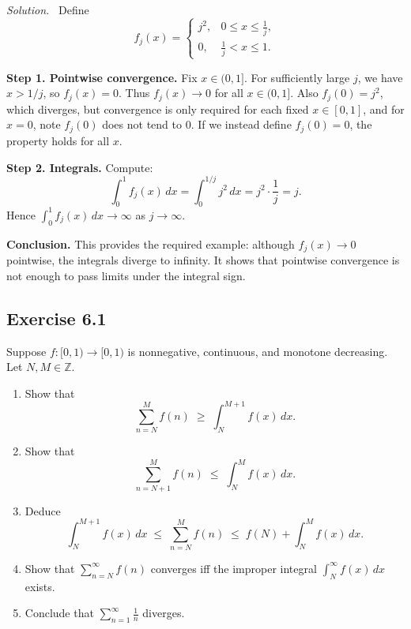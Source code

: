 \documentclass[11pt,a4paper]{article}
\newenvironment{solution}{\par\noindent\textit{Solution.}\ }{\par\vspace{0.5em}}
\begin{document}
\begin{solution}
	Define
	\[
	f_j(x) = 
	\begin{cases}
		j^2, & 0 \leq x \leq \tfrac{1}{j}, \\
		0,   & \tfrac{1}{j} < x \leq 1.
	\end{cases}
	\]
	
	\textbf{Step 1. Pointwise convergence.}  
	Fix $x\in(0,1]$. For sufficiently large $j$, we have $x > 1/j$, so $f_j(x)=0$.  
	Thus $f_j(x)\to 0$ for all $x\in(0,1]$.  
	Also $f_j(0)=j^2$, which diverges, but convergence is only required for each fixed $x\in[0,1]$, and for $x=0$, note $f_j(0)$ does not tend to $0$.  
	If we instead define $f_j(0)=0$, the property holds for all $x$.
	
	\textbf{Step 2. Integrals.}  
	Compute:
	\[
	\int_0^1 f_j(x)\,dx = \int_0^{1/j} j^2\,dx = j^2\cdot \frac{1}{j} = j.
	\]
	Hence $\int_0^1 f_j(x)\,dx \to \infty$ as $j\to\infty$.
	
	\textbf{Conclusion.}  
	This provides the required example: although $f_j(x)\to 0$ pointwise, the integrals diverge to infinity. It shows that pointwise convergence is not enough to pass limits under the integral sign.
\end{solution}

\subsection*{Exercise 6.1}
Suppose $f:[0,1)\to[0,1)$ is nonnegative, continuous, and monotone decreasing. 
Let $N,M\in\mathbb{Z}$.

\begin{enumerate}[label=\alph*)]
	\item Show that
	\[
	\sum_{n=N}^M f(n)\;\geq\;\int_N^{M+1} f(x)\,dx.
	\]
	
	\item Show that
	\[
	\sum_{n=N+1}^M f(n)\;\leq\;\int_N^M f(x)\,dx.
	\]
	
	\item Deduce
	\[
	\int_N^{M+1} f(x)\,dx \;\leq\; \sum_{n=N}^M f(n)\;\leq\; f(N)+\int_N^M f(x)\,dx.
	\]
	
	\item Show that $\sum_{n=N}^\infty f(n)$ converges iff the improper integral 
	$\int_N^\infty f(x)\,dx$ exists.
	
	\item Conclude that $\sum_{n=1}^\infty \tfrac{1}{n}$ diverges.
\end{enumerate}
\end{document}
